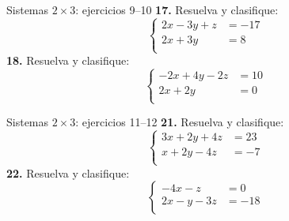 \documentclass[aspectratio=169]{beamer}
\begin{document}
\begin{frame}{Sistemas $2\times 3$: ejercicios 9--10}
\small
\textbf{17.} Resuelva y clasifique:
\[\left\{\begin{aligned}
2x-3y+z&=-17\\
2x+3y&=8\\
\end{aligned}\right.\]
\textbf{18.} Resuelva y clasifique:
\[\left\{\begin{aligned}
-2x+4y-2z&=10\\
2x+2y&=0\\
\end{aligned}\right.\]
\end{frame}
\begin{frame}{Sistemas $2\times 3$: ejercicios 11--12}
\small
\textbf{21.} Resuelva y clasifique:
\[\left\{\begin{aligned}
3x+2y+4z&=23\\
x+2y-4z&=-7\\
\end{aligned}\right.\]
\textbf{22.} Resuelva y clasifique:
\[\left\{\begin{aligned}
-4x-z&=0\\
2x-y-3z&=-18\\
\end{aligned}\right.\]
\end{frame}
\end{document}
